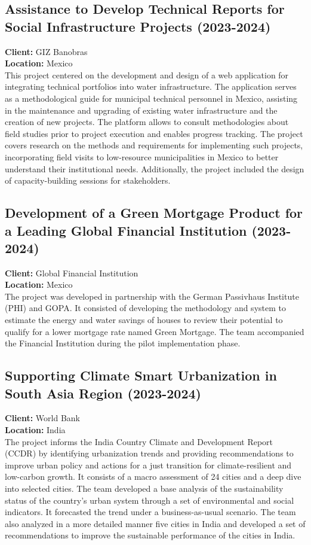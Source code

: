 \documentclass[
	a4paper,
	12pt,
	unnumberedsections,
]{CSSullivanBusinessReport}
\begin{document}
\subsection{Assistance to Develop Technical Reports for Social Infrastructure Projects (2023-2024)}
\textbf{Client:}  GIZ Banobras \\
\textbf{Location:}  Mexico \\[0.5em]
 This project centered on the development and design of a web application for integrating technical portfolios into water infrastructure. The application serves as a methodological guide for municipal technical personnel in Mexico, assisting in the maintenance and upgrading of existing water infrastructure and the creation of new projects. The platform allows to consult methodologies about field studies prior to project execution and enables progress tracking. The project covers research on the methods and requirements for implementing such projects, incorporating field visits to low-resource municipalities in Mexico to better understand their institutional needs. Additionally, the project included the design of capacity-building sessions for stakeholders.

\subsection{Development of a Green Mortgage Product for a Leading Global Financial Institution (2023-2024)}
\textbf{Client:}  Global Financial Institution \\
\textbf{Location:}  Mexico \\[0.5em]
 The project was developed in partnership with the German Passivhaus Institute (PHI) and GOPA. It consisted of developing the methodology and system to estimate the energy and water savings of houses to review their potential to qualify for a lower mortgage rate named Green Mortgage. The team accompanied the Financial Institution during the pilot implementation phase.

\subsection{Supporting Climate Smart Urbanization in South Asia Region (2023-2024)}
\textbf{Client:}  World Bank \\
\textbf{Location:}  India \\[0.5em]
 The project informs the India Country Climate and Development Report (CCDR) by identifying urbanization trends and providing recommendations to improve urban policy and actions for a just transition for climate-resilient and low-carbon growth. It consists of a macro assessment of 24 cities and a deep dive into selected cities. The team developed a base analysis of the sustainability status of the country's urban system through a set of environmental and social indicators. It forecasted the trend under a business-as-usual scenario. The team also analyzed in a more detailed manner five cities in India and developed a set of recommendations to improve the sustainable performance of the cities in India.
\end{document}
